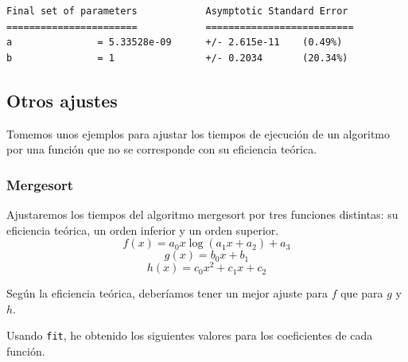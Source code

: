 \documentclass[a4]{article}
\begin{document}
\begin{verbatim}
Final set of parameters            Asymptotic Standard Error
=======================            ==========================
a               = 5.33528e-09      +/- 2.615e-11    (0.49%)
b               = 1                +/- 0.2034       (20.34%)
\end{verbatim}

\begin{figure}[H] \centering {}
\end{figure}

\subsection{Otros ajustes}

\begin{flushleft}
  Tomemos unos ejemplos para ajustar los tiempos de ejecución de un
  algoritmo por una función que no se corresponde con su eficiencia
  teórica.
\end{flushleft}

\subsubsection{Mergesort}

\begin{flushleft} 
  Ajustaremos los tiempos del algoritmo mergesort por tres funciones
  distintas: su eficiencia teórica, un orden inferior y un orden
  superior.
\[f(x)=a_0x\log(a_1x+a_2)+a_3\]
\[g(x)=b_0x+b_1\]
\[h(x)=c_0x^2+c_1x+c_2\]

Según la eficiencia teórica, deberíamos tener un mejor ajuste para $f$
que para $g$ y $h$.
\end{flushleft}

\begin{flushleft}
  Usando \texttt{fit}, he obtenido los siguientes valores para los
  coeficientes de cada función.
\end{flushleft}
\end{document}

